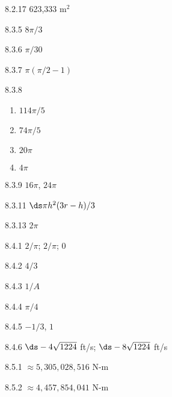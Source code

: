 \begin{Answer}{8.2.17}
{623,333 m$^2$}

\end{Answer}
\begin{Answer}{8.3.5}
 $8\pi/3$
\end{Answer}
\begin{Answer}{8.3.6}
 $\pi/30$
\end{Answer}
\begin{Answer}{8.3.7}
 $\pi(\pi/2-1)$
\end{Answer}
\begin{Answer}{8.3.8}
\begin{multicols}{2}
\begin{enumerate}
	\item	$114\pi/5$
	\item	$74\pi/5$
	\item	$20\pi$
	\item	$4\pi$
\end{enumerate}
\end{multicols}
\end{Answer}
\begin{Answer}{8.3.9}
 $16\pi$, $24\pi$
\end{Answer}
\begin{Answer}{8.3.11}
 $\ds \pi h^2(3r-h)/3$
\end{Answer}
\begin{Answer}{8.3.13}
 $2\pi$
\end{Answer}
\begin{Answer}{8.4.1}
 $2/\pi$; $2/\pi$; $0$
\end{Answer}
\begin{Answer}{8.4.2}
 $4/3$
\end{Answer}
\begin{Answer}{8.4.3}
 $1/A$
\end{Answer}
\begin{Answer}{8.4.4}
 $\pi/4$
\end{Answer}
\begin{Answer}{8.4.5}
 $-1/3$, $1$
\end{Answer}
\begin{Answer}{8.4.6}
 $\ds -4\sqrt{1224}$ ft/s; $\ds -8\sqrt{1224}$ ft/s
\end{Answer}
\begin{Answer}{8.5.1}
 $\approx 5,305,028,516$ N-m
\end{Answer}
\begin{Answer}{8.5.2}
 $\approx 4,457,854,041$ N-m
\end{Answer}
